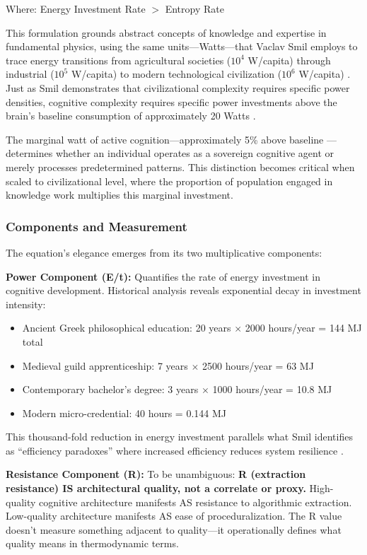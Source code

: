 Where: Energy Investment Rate $>$ Entropy Rate

This formulation grounds abstract concepts of knowledge and expertise in fundamental physics, using the same units---Watts---that Vaclav Smil employs to trace energy transitions from agricultural societies ($10^4$ W/capita) through industrial ($10^5$ W/capita) to modern technological civilization ($10^6$ W/capita) \citep{smil2017}. Just as Smil demonstrates that civilizational complexity requires specific power densities, cognitive complexity requires specific power investments above the brain's baseline consumption of approximately 20 Watts \citep{raichle2002}.

The marginal watt of active cognition---approximately 5\% above baseline \citep{jamadar2025}---determines whether an individual operates as a sovereign cognitive agent or merely processes predetermined patterns. This distinction becomes critical when scaled to civilizational level, where the proportion of population engaged in knowledge work multiplies this marginal investment.

\subsubsection{Components and Measurement}

The equation's elegance emerges from its two multiplicative components:

\textbf{Power Component (E/t):} Quantifies the rate of energy investment in cognitive development. Historical analysis reveals exponential decay in investment intensity:

\begin{itemize}
\item Ancient Greek philosophical education: 20 years $\times$ 2000 hours/year = 144 MJ total
\item Medieval guild apprenticeship: 7 years $\times$ 2500 hours/year = 63 MJ
\item Contemporary bachelor's degree: 3 years $\times$ 1000 hours/year = 10.8 MJ
\item Modern micro-credential: 40 hours = 0.144 MJ
\end{itemize}

This thousand-fold reduction in energy investment parallels what Smil identifies as ``efficiency paradoxes'' where increased efficiency reduces system resilience \citep{smil2018}.

\textbf{Resistance Component (R):} To be unambiguous: \textbf{R (extraction resistance) IS architectural quality, not a correlate or proxy.} High-quality cognitive architecture manifests AS resistance to algorithmic extraction. Low-quality architecture manifests AS ease of proceduralization. The R value doesn't measure something adjacent to quality---it operationally defines what quality means in thermodynamic terms.

